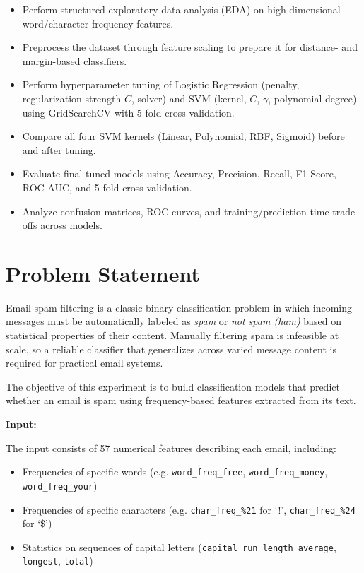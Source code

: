 \documentclass[12pt,a4paper]{article}
\begin{document}
\begin{itemize}
\item Perform structured exploratory data analysis (EDA) on high-dimensional word/character frequency features.
\item Preprocess the dataset through feature scaling to prepare it for distance- and margin-based classifiers.
\item Perform hyperparameter tuning of Logistic Regression (penalty, regularization strength $C$, solver) and SVM (kernel, $C$, $\gamma$, polynomial degree) using GridSearchCV with 5-fold cross-validation.
\item Compare all four SVM kernels (Linear, Polynomial, RBF, Sigmoid) before and after tuning.
\item Evaluate final tuned models using Accuracy, Precision, Recall, F1-Score, ROC-AUC, and 5-fold cross-validation.
\item Analyze confusion matrices, ROC curves, and training/prediction time trade-offs across models.
\end{itemize}

\section{Problem Statement}

Email spam filtering is a classic binary classification problem in which incoming messages must be automatically labeled as \textit{spam} or \textit{not spam (ham)} based on statistical properties of their content. Manually filtering spam is infeasible at scale, so a reliable classifier that generalizes across varied message content is required for practical email systems.

The objective of this experiment is to build classification models that predict whether an email is spam using frequency-based features extracted from its text.

\textbf{Input:}

The input consists of 57 numerical features describing each email, including:
\begin{itemize}
\item Frequencies of specific words (e.g. \texttt{word\_freq\_free}, \texttt{word\_freq\_money}, \texttt{word\_freq\_your})
\item Frequencies of specific characters (e.g. \texttt{char\_freq\_\%21} for `!', \texttt{char\_freq\_\%24} for `\$')
\item Statistics on sequences of capital letters (\texttt{capital\_run\_length\_average}, \texttt{longest}, \texttt{total})
\end{itemize}
\end{document}

